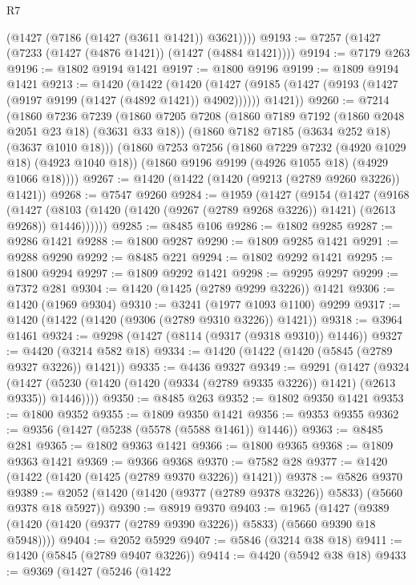 \begin{lexlean}{R7}
\begin{coremodule}
        (@1427 (@7186 (@1427 (@3611 @1421)) @3621))))
@9193 := @7257 (@1427 (@7233 (@1427 (@4876 @1421)) (@1427 (@4884 @1421))))
@9194 := @7179 @263
@9196 := @1802 @9194 @1421
@9197 := @1800 @9196
@9199 := @1809 @9194 @1421
@9213 := @1420
    (@1422
      (@1420
        (@1427 (@9185 (@1427 (@9193 (@1427 (@9197 @9199 (@1427 (@4892 @1421)) @4902))))))
        @1421))
@9260 := @7214
    (@1860
      @7236
      @7239
      (@1860
        @7205
        @7208
        (@1860 @7189 @7192 (@1860 @2048 @2051 @23 @18) (@3631 @33 @18))
        (@1860 @7182 @7185 (@3634 @252 @18) (@3637 @1010 @18)))
      (@1860
        @7253
        @7256
        (@1860 @7229 @7232 (@4920 @1029 @18) (@4923 @1040 @18))
        (@1860 @9196 @9199 (@4926 @1055 @18) (@4929 @1066 @18))))
@9267 := @1420 (@1422 (@1420 (@9213 (@2789 @9260 @3226)) @1421))
@9268 := @7547 @9260
@9284 := @1959
    (@1427
      (@9154
        (@1427
          (@9168
            (@1427
              (@8103 (@1420 (@1420 (@9267 (@2789 @9268 @3226)) @1421) (@2613 @9268)) @1446))))))
@9285 := @8485 @106
@9286 := @1802 @9285
@9287 := @9286 @1421
@9288 := @1800 @9287
@9290 := @1809 @9285 @1421
@9291 := @9288 @9290
@9292 := @8485 @221
@9294 := @1802 @9292 @1421
@9295 := @1800 @9294
@9297 := @1809 @9292 @1421
@9298 := @9295 @9297
@9299 := @7372 @281
@9304 := @1420 (@1425 (@2789 @9299 @3226)) @1421
@9306 := @1420 (@1969 @9304)
@9310 := @3241 (@1977 @1093 @1100) @9299
@9317 := @1420 (@1422 (@1420 (@9306 (@2789 @9310 @3226)) @1421))
@9318 := @3964 @1461
@9324 := @9298 (@1427 (@8114 (@9317 (@9318 @9310)) @1446))
@9327 := @4420 (@3214 @582 @18)
@9334 := @1420 (@1422 (@1420 (@5845 (@2789 @9327 @3226)) @1421))
@9335 := @4436 @9327
@9349 := @9291
    (@1427
      (@9324 (@1427 (@5230 (@1420 (@1420 (@9334 (@2789 @9335 @3226)) @1421) (@2613 @9335)) @1446))))
@9350 := @8485 @263
@9352 := @1802 @9350 @1421
@9353 := @1800 @9352
@9355 := @1809 @9350 @1421
@9356 := @9353 @9355
@9362 := @9356 (@1427 (@5238 (@5578 (@5588 @1461)) @1446))
@9363 := @8485 @281
@9365 := @1802 @9363 @1421
@9366 := @1800 @9365
@9368 := @1809 @9363 @1421
@9369 := @9366 @9368
@9370 := @7582 @28
@9377 := @1420 (@1422 (@1420 (@1425 (@2789 @9370 @3226)) @1421))
@9378 := @5826 @9370
@9389 := @2052 (@1420 (@1420 (@9377 (@2789 @9378 @3226)) @5833) (@5660 @9378 @18 @5927))
@9390 := @8919 @9370
@9403 := @1965
    (@1427 (@9389 (@1420 (@1420 (@9377 (@2789 @9390 @3226)) @5833) (@5660 @9390 @18 @5948))))
@9404 := @2052 @5929
@9407 := @5846 (@3214 @38 @18)
@9411 := @1420 (@5845 (@2789 @9407 @3226))
@9414 := @4420 (@5942 @38 @18)
@9433 := @9369
    (@1427
      (@5246
        (@1422

\end{coremodule}
\end{lexlean}
